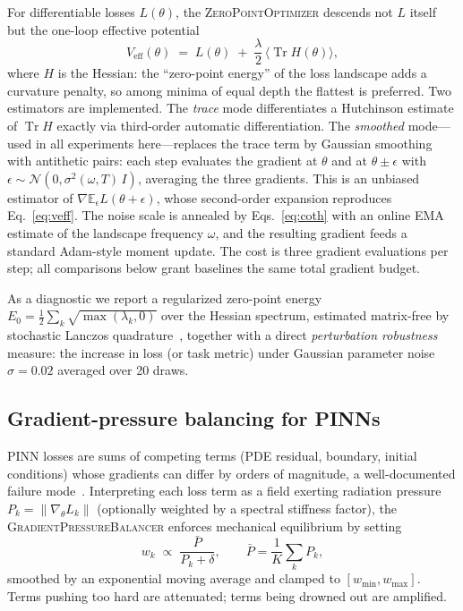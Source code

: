 \documentclass[10pt,twocolumn]{article}
\begin{document}
For differentiable losses $L(\theta)$, the \textsc{ZeroPointOptimizer} descends not $L$ itself
but the one-loop effective potential
\begin{equation}
V_{\mathrm{eff}}(\theta) \;=\; L(\theta) \;+\;
\frac{\lambda}{2}\,\big\langle \operatorname{Tr} H(\theta)\big\rangle ,
\label{eq:veff}
\end{equation}
where $H$ is the Hessian: the ``zero-point energy'' of the loss landscape adds a curvature
penalty, so among minima of equal depth the flattest is preferred. Two estimators are
implemented. The \emph{trace} mode differentiates a Hutchinson estimate of
$\operatorname{Tr}H$ exactly via third-order automatic differentiation. The \emph{smoothed}
mode---used in all experiments here---replaces the trace term by Gaussian smoothing with
antithetic pairs: each step evaluates the gradient at $\theta$ and at $\theta \pm \epsilon$
with $\epsilon \sim \mathcal{N}(0, \sigma^2(\omega,T)\,I)$, averaging the three gradients. This
is an unbiased estimator of $\nabla \mathbb{E}_\epsilon L(\theta+\epsilon)$, whose second-order
expansion reproduces Eq.~\eqref{eq:veff}. The noise scale is annealed by
Eqs.~\eqref{eq:coth} with an online EMA estimate of the landscape frequency $\omega$, and the
resulting gradient feeds a standard Adam-style moment update. The cost is three gradient
evaluations per step; all comparisons below grant baselines the same total gradient budget.

As a diagnostic we report a regularized zero-point energy
$E_0 = \tfrac{1}{2}\sum_k \sqrt{\max(\lambda_k,0)}$ over the Hessian spectrum, estimated
matrix-free by stochastic Lanczos quadrature~\cite{ubaru2017}, together with a direct
\emph{perturbation robustness} measure: the increase in loss (or task metric) under Gaussian
parameter noise $\sigma = 0.02$ averaged over 20 draws.

\subsection{Gradient-pressure balancing for PINNs}
\label{sec:balancer}

PINN losses are sums of competing terms (PDE residual, boundary, initial conditions) whose
gradients can differ by orders of magnitude, a well-documented failure
mode~\cite{wang2021,raissi2019}. Interpreting each loss term as a field exerting radiation
pressure $P_k = \lVert \nabla_\theta L_k \rVert$ (optionally weighted by a spectral stiffness
factor), the \textsc{GradientPressureBalancer} enforces mechanical equilibrium by setting
\begin{equation}
w_k \;\propto\; \frac{\bar P}{P_k + \delta}, \qquad
\bar P = \frac{1}{K}\sum_k P_k ,
\label{eq:balance}
\end{equation}
smoothed by an exponential moving average and clamped to $[w_{\min}, w_{\max}]$. Terms pushing
too hard are attenuated; terms being drowned out are amplified.
\end{document}
